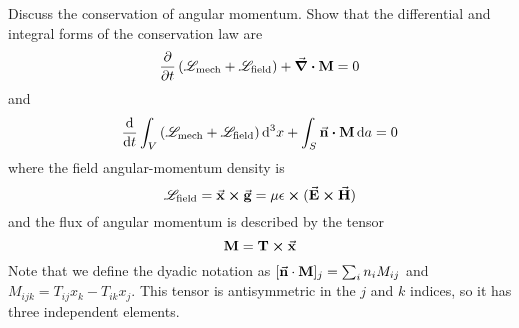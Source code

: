 \documentclass[a4paper,twoside]{article}
\begin{document}
Discuss the conservation of angular momentum. Show that the differential and integral forms of the conservation law are
\begin{equation}
    \pdv{t}\left( \mathscr{L}_{\text{mech}} + \mathscr{L}_{\text{field}} \right) + \div{\vb{M}} = 0
\end{equation}
and
\begin{equation}
    \dv{t} \int_{V} \left( \mathscr{L}_{\text{mech}} + \mathscr{L}_{\text{field}} \right) \dd[3]{x} + \int_{S} \va{n} \vdot \vb{M} \dd{a} = 0
\end{equation}
where the field angular-momentum density is
\begin{equation}
    \mathscr{L}_{\text{field}} = \va{x} \cross \va{g} = \mu \epsilon \cross ( \va{E} \cross \va{H})
\end{equation}
and the flux of angular momentum is described by the tensor
\begin{equation}
    \vb{M} = \vb{T} \cross \va{x}
\end{equation}
Note that we define the dyadic notation as $ [\va{n} \cdot \vb{M}]_j = \sum_i n_i M_{ij} $ and $ M_{ijk} = T_{ij} x_k - T_{ik} x_j $. This tensor is antisymmetric in the $ j $ and $ k $ indices, so it has three independent elements.
\end{document}

